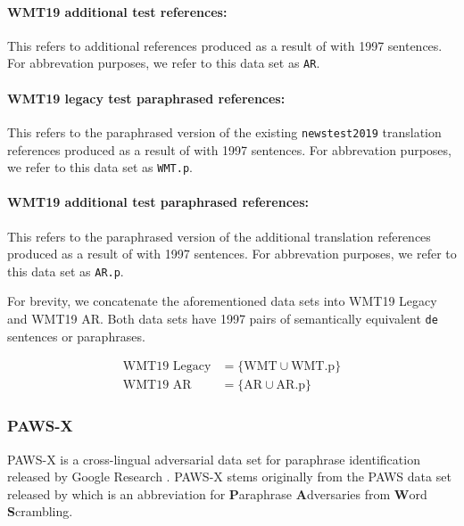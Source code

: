 \documentclass[11pt,a4paper]{article}
\begin{document}
\paragraph{WMT19 additional test references:} This refers to additional references produced as a result of \citet{freitag-bleu-paraphrase-references-2020} with 1997 sentences. For abbrevation purposes, we refer to this data set as \texttt{AR}. 

\paragraph{WMT19 legacy test paraphrased references:} This refers to the paraphrased version of the existing \texttt{newstest2019} translation references produced as a result of \citet{freitag-bleu-paraphrase-references-2020} with 1997 sentences. For abbrevation purposes, we refer to this data set as \texttt{WMT.p}. 

\paragraph{WMT19 additional test paraphrased references:}This refers to the paraphrased version of the additional translation references produced as a result of \citet{freitag-bleu-paraphrase-references-2020} with 1997 sentences. For abbrevation purposes, we refer to this data set as \texttt{AR.p}.

For brevity, we concatenate the aforementioned data sets into WMT19 Legacy and WMT19 AR. Both data sets have 1997 pairs of semantically equivalent \texttt{de} sentences or paraphrases.

\vspace{-10pt}
\begin{align}
  \text{WMT19 Legacy} &= \{\text{WMT} \cup \text{WMT.p} \} \label{wmt19legacy} \\
  \text{WMT19 AR} &= \{\text{AR} \cup \text{AR.p} \} \label{wmt19ar}
\end{align}

\subsubsection{PAWS-X}

PAWS-X is a cross-lingual adversarial data set for paraphrase identification released by Google Research \citep{pawsx2019emnlp}. PAWS-X stems originally from the PAWS data set released by \citet{zhang2019paws} which is an abbreviation for \textbf{P}araphrase \textbf{A}dversaries from \textbf{W}ord \textbf{S}crambling.
\end{document}
